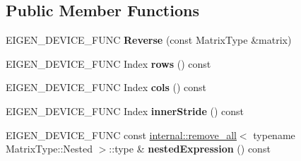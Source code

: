 \subsection*{Public Member Functions}
\begin{DoxyCompactItemize}
\item 
\mbox{\label{class_eigen_1_1_reverse_a96b3fcbbafa514745407b895acf4c8b4}} 
E\+I\+G\+E\+N\+\_\+\+D\+E\+V\+I\+C\+E\+\_\+\+F\+U\+NC {\bfseries Reverse} (const Matrix\+Type \&matrix)
\item 
\mbox{\label{class_eigen_1_1_reverse_ac28de933d74d3feb733c222559f574f4}} 
E\+I\+G\+E\+N\+\_\+\+D\+E\+V\+I\+C\+E\+\_\+\+F\+U\+NC Index {\bfseries rows} () const
\item 
\mbox{\label{class_eigen_1_1_reverse_a915f526f2c8a720da1e99a888ce87c48}} 
E\+I\+G\+E\+N\+\_\+\+D\+E\+V\+I\+C\+E\+\_\+\+F\+U\+NC Index {\bfseries cols} () const
\item 
\mbox{\label{class_eigen_1_1_reverse_a3ca8f0d426460bcbba3bff75bc38f6cb}} 
E\+I\+G\+E\+N\+\_\+\+D\+E\+V\+I\+C\+E\+\_\+\+F\+U\+NC Index {\bfseries inner\+Stride} () const
\item 
\mbox{\label{class_eigen_1_1_reverse_a92346d852967a5fe2d8cb5567f22d93e}} 
E\+I\+G\+E\+N\+\_\+\+D\+E\+V\+I\+C\+E\+\_\+\+F\+U\+NC const \mbox{\hyperlink{struct_eigen_1_1internal_1_1remove__all}{internal\+::remove\+\_\+all}}$<$ typename Matrix\+Type\+::\+Nested $>$\+::type \& {\bfseries nested\+Expression} () const
\end{DoxyCompactItemize}
